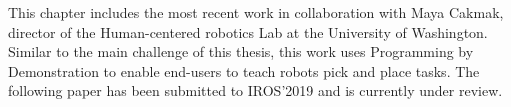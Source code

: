 This chapter includes the most recent work in collaboration with Maya Cakmak, director of the Human-centered robotics Lab at the University of Washington.
Similar to the main challenge of this thesis, this work uses Programming by Demonstration to enable end-users to teach robots pick and place tasks.
The following paper has been submitted to IROS'2019 and is currently under review.
